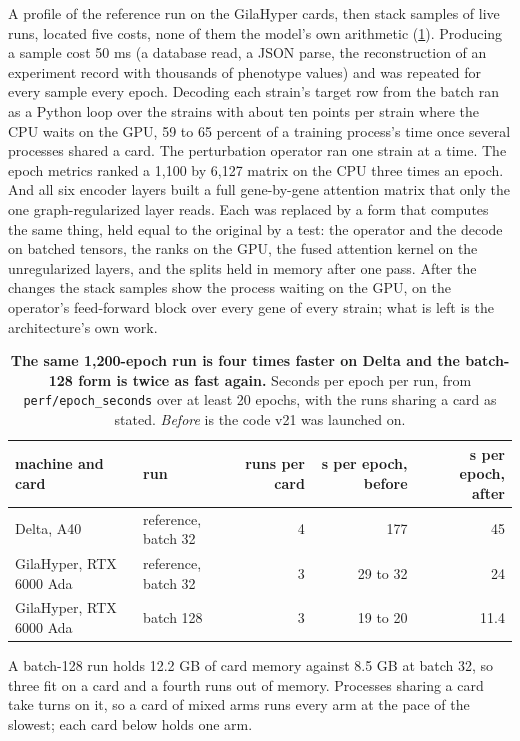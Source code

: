  A profile of the reference run on the GilaHyper cards, then
stack samples of live runs, located five costs, none of them the model's own arithmetic
(\cref{tab:night-timing}). Producing a sample cost 50 ms (a database read, a JSON parse, the
reconstruction of an experiment record with thousands of phenotype values) and was repeated
for every sample every epoch. Decoding each strain's target row from the batch ran as a
Python loop over the strains with about ten points per strain where the CPU waits on the
GPU, 59 to 65 percent of a training process's time once several processes shared a card.
The perturbation operator ran one strain at a time. The epoch metrics ranked a 1{,}100 by
6{,}127 matrix on the CPU three times an epoch. And all six encoder layers built a full
gene-by-gene attention matrix that only the one graph-regularized layer reads. Each was
replaced by a form that computes the same thing, held equal to the original by a test: the
operator and the decode on batched tensors, the ranks on the GPU, the fused attention kernel
on the unregularized layers, and the splits held in memory after one pass. After the changes
the stack samples show the process waiting on the GPU, on the operator's feed-forward block
over every gene of every strain; what is left is the architecture's own work.

\begin{table}[htbp]
  \centering
  \footnotesize
  \caption[]{\textbf{The same 1{,}200-epoch run is four times faster on Delta and the
  batch-128 form is twice as fast again.} Seconds per epoch per run, from
  \texttt{perf/epoch\_seconds} over at least 20 epochs, with the runs sharing a card as
  stated. \emph{Before} is the code v21 was launched on.}
  \label{tab:night-timing}
  \begin{tabular}{@{}llrrr@{}}
    \toprule
    machine and card & run & runs per card & s per epoch, before & s per epoch, after \\
    \midrule
    Delta, A40 & reference, batch 32 & 4 & 177 & 45 \\
    GilaHyper, RTX 6000 Ada & reference, batch 32 & 3 & 29 to 32 & 24 \\
    GilaHyper, RTX 6000 Ada & batch 128 & 3 & 19 to 20 & 11.4 \\
    \bottomrule
  \end{tabular}
\end{table}

A batch-128 run holds 12.2 GB of card memory against 8.5 GB at batch 32, so three fit on a
card and a fourth runs out of memory. Processes sharing a card take turns on it, so a card
of mixed arms runs every arm at the pace of the slowest; each card below holds one arm.

